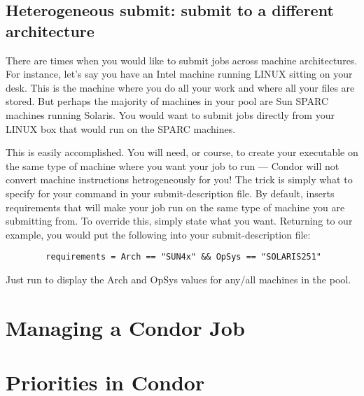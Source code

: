\subsection{Heterogeneous submit: submit to a different architecture} 

There are times when you would like to submit jobs across machine
architectures. For instance, let's say you have an Intel machine running
LINUX sitting on your desk. This is the machine where you do all your
work and where all your files are stored. But perhaps the majority of
machines in your pool are Sun SPARC machines running Solaris. You would
want to submit jobs directly from your LINUX box that would run on the
SPARC machines.

This is easily accomplished.  You will need, or course, to create your
executable on the same type of machine where you want your job to run ---
Condor will not convert machine instructions hetrogeneously for you! The
trick is simply what to specify for your  command in
your submit-description file.  By default,  inserts
requirements that will make your job run on the same type of machine you
are submitting from.  To override this, simply state what you want.
Returning to our example, you would put the following into your
submit-description file:
\begin{verbatim}
        requirements = Arch == "SUN4x" && OpSys == "SOLARIS251"
\end{verbatim}
Just run  to display the Arch and OpSys values for any/all 
machines in the pool.




\section{Managing a Condor Job}


\section{Priorities in Condor}

